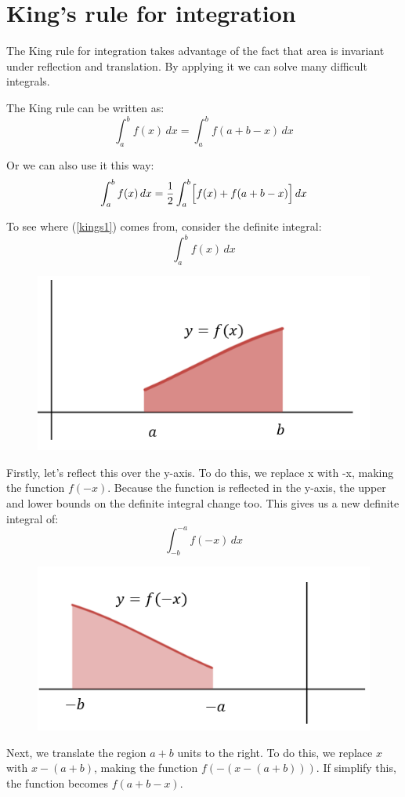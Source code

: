\documentclass[../main.tex]{subfiles}
\begin{document}
\section{King's rule for integration}
The King rule for integration takes advantage of the fact that area is invariant under reflection and translation. By applying it we can solve many difficult integrals.

The King rule can be written as:
\begin{equation}\label{kings1}
    \int_{a}^{b} f(x)\,dx = \int_{a}^{b} f(a+b-x)\, dx
\end{equation}

Or we can also use it this way:
\begin{equation}\label{kings2}
    \int_{a}^{b} f(x)\,dx = \frac{1}{2}\int_{a}^{b} \Bigl[f(x) + f(a+b-x)\Bigl]\, dx
\end{equation}

To see where (\ref{kings1}) comes from, consider the definite integral:
\[\int_{a}^{b} f(x)\,dx\]

\begin{figure}[h]
    \centering
    \includegraphics[width=0.4\linewidth]{images/kingsrule1.png}
\end{figure}

Firstly, let's reflect this over the y-axis. To do this, we replace {x} with {-x}, making the function $f(-x)$. Because the function is reflected in the y-axis, the upper and lower bounds on the definite integral change too. This gives us a new definite integral of:
\[\int_{-b}^{-a} f(-x)\,dx\]

\begin{figure}[h]
    \centering
    \includegraphics[width=0.4\linewidth]{images/kingsrule2.png}
\end{figure}

Next, we translate the region $a+b$ units to the right. To do this, we replace $x$ with $x-(a+b)$, making the function $f(-(x-(a+b)))$. If simplify this, the function becomes $f(a+b-x)$.
\end{document}
